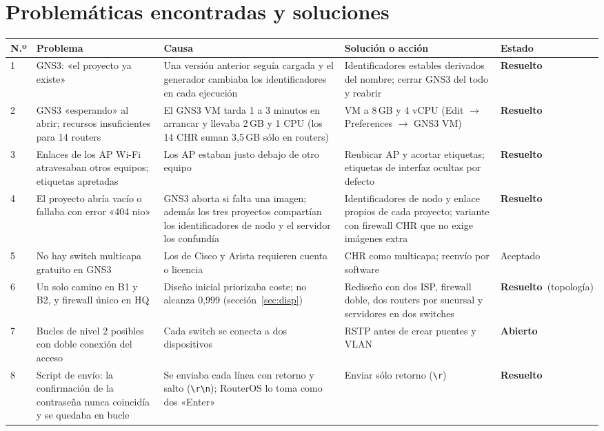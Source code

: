 \documentclass[11pt,a4paper]{article}
\newcommand{\hecho}{\textcolor{verde}{\textbf{Resuelto}}}
\newcommand{\abierto}{\textcolor{rojo}{\textbf{Abierto}}}
\begin{document}
\section{Problemáticas encontradas y soluciones}\label{sec:probl}
\begingroup\footnotesize
\begin{longtable}{@{}p{0.5cm}p{4.3cm}p{4.2cm}p{5.4cm}p{1.6cm}@{}}
\toprule
\textbf{N.º} & \textbf{Problema} & \textbf{Causa} & \textbf{Solución o acción} & \textbf{Estado}\\
\midrule
\endhead
1 & GNS3: «el proyecto ya existe» & Una versión anterior seguía cargada y el generador cambiaba los identificadores en cada ejecución & Identificadores estables derivados del nombre; cerrar GNS3 del todo y reabrir & \hecho\\
2 & GNS3 «esperando» al abrir; recursos insuficientes para 14 routers & El GNS3 VM tarda 1 a 3 minutos en arrancar y llevaba 2\,GB y 1 CPU (los 14 CHR suman 3,5\,GB sólo en routers) & VM a 8\,GB y 4 vCPU (Edit $\rightarrow$ Preferences $\rightarrow$ GNS3 VM) & \hecho\\
3 & Enlaces de los AP Wi-Fi atravesaban otros equipos; etiquetas apretadas & Los AP estaban justo debajo de otro equipo & Reubicar AP y acortar etiquetas; etiquetas de interfaz ocultas por defecto & \hecho\\
4 & El proyecto abría vacío o fallaba con error «404 nio» & GNS3 aborta si falta una imagen; además los tres proyectos compartían los identificadores de nodo y el servidor los confundía & Identificadores de nodo y enlace propios de cada proyecto; variante con firewall CHR que no exige imágenes extra & \hecho\\
5 & No hay switch multicapa gratuito en GNS3 & Los de Cisco y Arista requieren cuenta o licencia & CHR como multicapa; reenvío por software & Aceptado\\
6 & Un solo camino en B1 y B2, y firewall único en HQ & Diseño inicial priorizaba coste; no alcanza 0,999 (sección~\ref{sec:disp}) & Rediseño con dos ISP, firewall doble, dos routers por sucursal y servidores en dos switches & \hecho\ (topología)\\
7 & Bucles de nivel 2 posibles con doble conexión del acceso & Cada switch se conecta a dos dispositivos & RSTP antes de crear puentes y VLAN & \abierto\\
8 & Script de envío: la confirmación de la contraseña nunca coincidía y se quedaba en bucle & Se enviaba cada línea con retorno y salto (\texttt{\textbackslash r\textbackslash n}); RouterOS lo toma como dos «Enter» & Enviar sólo retorno (\texttt{\textbackslash r}) & \hecho\\

\end{longtable}
\end{document}
